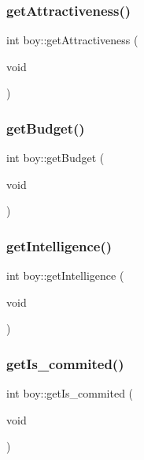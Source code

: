 \subsubsection{\texorpdfstring{get\+Attractiveness()}{getAttractiveness()}}
{\footnotesize\ttfamily int boy\+::get\+Attractiveness (\begin{DoxyParamCaption}\item[{void}]{ }\end{DoxyParamCaption})}

\mbox{\label{classboy_afcc38a4a00dcb96193565acce288b170}} 
\subsubsection{\texorpdfstring{get\+Budget()}{getBudget()}}
{\footnotesize\ttfamily int boy\+::get\+Budget (\begin{DoxyParamCaption}\item[{void}]{ }\end{DoxyParamCaption})}

\mbox{\label{classboy_a7e97d2b18e6e788d3665f89c5c324a4c}} 
\subsubsection{\texorpdfstring{get\+Intelligence()}{getIntelligence()}}
{\footnotesize\ttfamily int boy\+::get\+Intelligence (\begin{DoxyParamCaption}\item[{void}]{ }\end{DoxyParamCaption})}

\mbox{\label{classboy_adfc4e65cda02ff33a0fdf3809f808c6d}} 
\subsubsection{\texorpdfstring{get\+Is\+\_\+commited()}{getIs\_commited()}}
{\footnotesize\ttfamily int boy\+::get\+Is\+\_\+commited (\begin{DoxyParamCaption}\item[{void}]{ }\end{DoxyParamCaption})}

